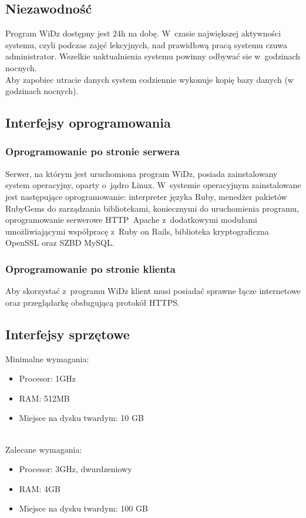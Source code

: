 \documentclass[12pt,leqno,twoside]{mwart}
\begin{document}
\subsection{Niezawodność}
\noindent Program WiDz dostępny jest 24h na dobę. W~czasie największej aktywności systemu, czyli podczas zajęć lekcyjnych, nad prawidłową pracą systemu czuwa administrator. Wszelkie uaktualnienia systemu powinny odbywać sie w~godzinach nocnych.\\
\indent Aby zapobiec utracie danych system codziennie wykonuje kopię bazy danych (w godzinach nocnych).

\subsection{Interfejsy oprogramowania}
\subsubsection{Oprogramowanie po stronie serwera}
\noindent Serwer, na którym jest uruchomiona program WiDz, posiada zainstalowany system operacyjny, oparty o~jądro Linux. W~systemie operacyjnym zainstalowane jest następujące oprogramowanie: interpreter języka Ruby, menedżer pakietów RubyGems do zarządzania bibliotekami, koniecznymi do uruchomienia programu, oprogramowanie serwerowe HTTP~Apache z~dodatkowymi modułami umożliwiającymi współpracę z~Ruby on Rails, biblioteka kryptograficzna OpenSSL oraz SZBD MySQL.

\subsubsection{Oprogramowanie po stronie klienta}
\noindent Aby skorzystać z~programu WiDz klient musi posiadać sprawne łącze internetowe oraz przeglądarkę obsługującą protokół HTTPS.

\subsection{Interfejsy sprzętowe}
\noindent Minimalne wymagania:
\begin{itemize}
	\item Procesor: 1GHz
	\item RAM: 512MB
	\item Miejsce na dysku twardym: 10 GB
\end{itemize}
\noindent \\
\noindent Zalecane wymagania:
\begin{itemize}
	\item Procesor: 3GHz, dwurdzeniowy
	\item RAM: 4GB
	\item Miejsce na dysku twardym: 100 GB
\end{itemize}
\end{document}

